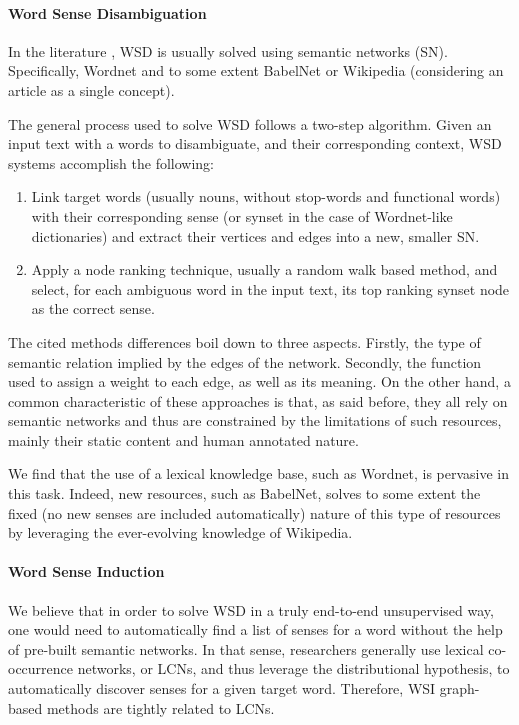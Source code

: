 \paragraph{Word Sense Disambiguation}In the literature \cite{2007.Sinha.Mihalcea.Unsupervised,2007.Tsatsaronis.WSDwithSpreading,2007.Navigli.GraphConnectivity,2009.Agirre.PersonalizedPageRankWSD,2010.Klapaftis.WSD.WSD.HierarchicalGraphs,2010.Siberer.GraphCooccurrenceWSD,2014.Moro.Navigli.EntityLinking_WSD}, WSD 
is usually solved using semantic networks (SN). Specifically, Wordnet and to some extent BabelNet or Wikipedia (considering an article as a single concept).

The general process used to solve WSD follows a two-step algorithm. Given an input text with a words to disambiguate, and their corresponding context, WSD systems accomplish the following:
\begin{enumerate}
\item Link target words (usually nouns, without stop-words and functional words) with their corresponding  sense (or synset in the case of Wordnet-like dictionaries) and extract their vertices and edges into a new, smaller SN. 
\item Apply a node ranking technique, usually a random walk based method, and select, for each ambiguous word in the input text,  its top ranking synset node as the correct sense.
\end{enumerate}


The cited methods differences boil down to three aspects. Firstly, the type of semantic relation implied by the edges of the network. Secondly, the function used to  assign a weight to each edge, as well as its meaning. On the other hand, a common characteristic of these approaches is that, as said before, they all rely on semantic networks and thus are constrained by the limitations of such resources, mainly their static content and human annotated nature. 


We find that the use of a lexical knowledge base, such as Wordnet, is pervasive in this task. Indeed, new resources, such as BabelNet, solves to some extent the fixed (no new senses are included automatically) nature of this type of resources by leveraging the ever-evolving knowledge of Wikipedia. 

\paragraph{Word Sense Induction}We believe that in order to solve WSD in a truly end-to-end unsupervised way, one would need to automatically find a list of senses for a word without the help of pre-built semantic networks. In that sense, researchers generally use lexical co-occurrence networks, or LCNs, and thus leverage the distributional hypothesis, to automatically discover senses for a given target word. Therefore, WSI graph-based methods \cite{2004.Veronis,2007.Klapaftis.UOY,2010.Navigli.InducingWordSenses.Triangles,2008.Klapaftis.WSIUsingCollocations,2011.DiMarco.Navigli.ClusteringWebSearch,2011.Jurgens.WSICommunityDetection} are tightly related to LCNs.
 
